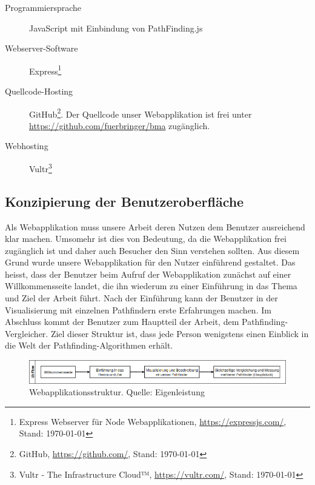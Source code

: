 \documentclass[12pt,a4paper,german]{report}
\begin{document}
\begin{description}
  \item [Programmiersprache] JavaScript mit Einbindung von PathFinding.js \cite{pfjs}
  \item [Webserver-Software] Express\footnote{Express Webserver für Node Webapplikationen, \url{https://expressjs.com/}, Stand: \today}
  \item [Quellcode-Hosting] GitHub\footnote{GitHub, \url{https://github.com/}, Stand: \today}. Der Quellcode unser Webapplikation ist frei unter\\ \url{https://github.com/fuerbringer/bma} zugänglich.
  \item [Webhosting] Vultr\footnote{Vultr - The Infrastructure Cloud™, \url{https://vultr.com/}, Stand: \today}
\end{description}

\subsection{Konzipierung der Benutzeroberfläche}
Als Webapplikation muss unsere Arbeit deren Nutzen dem Benutzer ausreichend klar machen. 
Umsomehr ist dies von Bedeutung, da die Webapplikation frei zugänglich ist und daher auch Besucher den Sinn verstehen sollten. 
Aus diesem Grund wurde unsere Webapplikation für den Nutzer einführend gestaltet. 
Das heisst, dass der Benutzer beim Aufruf der Webapplikation zunächst auf einer Willkommensseite landet, die ihn wiederum zu einer Einführung in das Thema und Ziel der Arbeit führt. 
Nach der Einführung kann der Benutzer in der Visualisierung mit einzelnen Pathfindern erste Erfahrungen machen. 
Im Abschluss kommt der Benutzer zum Hauptteil der Arbeit, dem Pathfinding-Vergleicher. 
Ziel dieser Struktur ist, dass jede Person wenigstens einen Einblick in die Welt der Pathfinding-Algorithmen erhält.
\begin{figure}[h]
  \centering
  \includegraphics[width=16cm]{uiflow}
  \caption[Struktur der Webapplikation.]{Webapplikationsstruktur. Quelle: Eigenleistung}
  \label{fig:uiflow}
\end{figure}

\clearpage
\end{document}
